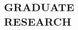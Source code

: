 \documentclass[margin, 10pt]{res} %
\begin{document}
\begin{resume}
 
 
\section{GRADUATE \\ RESEARCH}


\end{resume}
\end{document}
